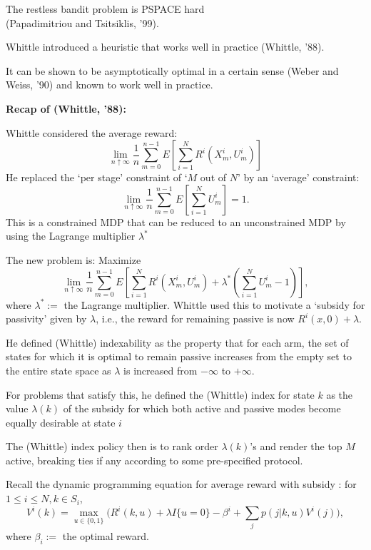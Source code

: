 \documentclass{slides}
\begin{document}
 {\large \color{dblue}
 
 The restless bandit  problem is PSPACE hard\\ (Papadimitriou and Tsitsiklis, '99). 
 
 Whittle introduced a heuristic that works well in practice (Whittle, '88).
 
 It can be shown to be asymptotically optimal in a certain sense (Weber and Weiss, '90) and known to work well in practice.
 
 
 \newpage
 

 
 \textbf{Recap of (Whittle, '88):}
 
 Whittle considered the average reward:
 $$\lim_{n\uparrow\infty}\frac{1}{n}\sum_{m=0}^{n-1}E\left[\sum_{i=1}^NR^i(X^i_m,U^i_m)\right]$$
 He replaced the `per stage' constraint of `$M$ out of $N$' by an `average' constraint:
 $$\lim_{n\uparrow\infty}\frac{1}{n}\sum_{m=0}^{n-1}E\left[\sum_{i=1}^NU^i_m\right] = 1.$$
This is a constrained MDP that can be reduced to an unconstrained MDP by using the Lagrange multiplier $\lambda^*$

\newpage

The new problem is:  Maximize
$$\lim_{n\uparrow\infty}\frac{1}{n}\sum_{m=0}^{n-1}E\left[\sum_{i=1}^NR^i(X^i_m,U^i_m) + \lambda^*(\sum_{i=1}^NU^i_m-1)\right],$$
where $\lambda^* :=$ the Lagrange multiplier. Whittle used this to motivate a {\color{red} `subsidy for passivity'} given by $\lambda$, i.e., the reward for remaining passive is now $R^i(x,0) + \lambda$.

He defined {\color{red} (Whittle) indexability} as the property that for each arm,  the set of states for which it is optimal to remain passive {\color{red} increases} from the empty set to the entire state space as $\lambda$ is increased from $-\infty$ to $+\infty$.

\newpage

For problems that satisfy this, he defined the {\color{red} (Whittle) index} for state $k$ as the value $\lambda(k)$ of the subsidy for which both active and passive modes become equally desirable at state $i$

The {\color{red} (Whittle) index policy} then is to rank order $\lambda(k)$'s and render the top $M$ active, breaking ties if any according to some pre-specified protocol.

\newpage

Recall the dynamic programming equation for average reward with subsidy : for $1 \leq i \leq N, k \in S_i$, 
$$V^i(k) = \max_{u\in\{0,1\}}\Big(R^i(k,u) + \lambda I\{u=0\} - \beta^i + \sum_jp(j|k,u)V^i(j)\Big),$$
where $\beta_i :=$ the optimal reward.

}
\end{document}
